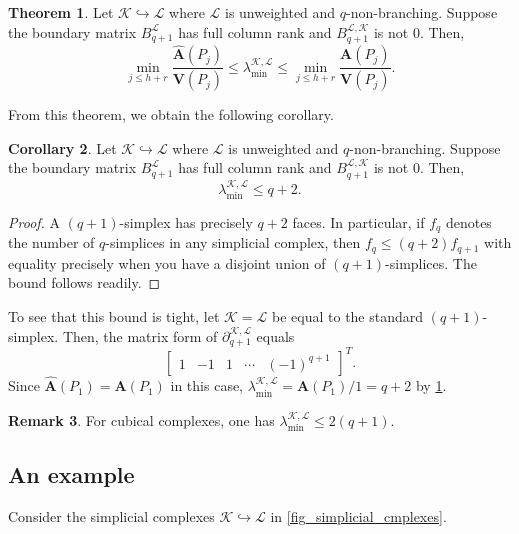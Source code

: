 \documentclass{article}
\theoremstyle{definition}
\newtheorem{theorem}{Theorem}[section]
\newtheorem{remark}[theorem]{Remark}
\newtheorem{corollary}[theorem]{Corollary}
\newcommand{\KK}{\mathcal{K}}
\newcommand{\LL}{\mathcal{L}}
\begin{document}
\begin{theorem}\label{prop:realcheeger}
Let $\KK\hookrightarrow \LL$ where $\LL$ is unweighted and $q$-non-branching. 
Suppose the boundary matrix $B_{q+1}^\LL$ has full column rank and $B_{q+1}^{\LL, \KK}$ is not $0$.
Then,
\[
\min\limits_{j\leq h+r}\frac{\widehat{\mathbf{A}}(P_j)}{\mathbf{V}(P_j)} \leq \lambda_{\mathrm{min}}^{\KK, \LL}\leq \min\limits_{j\leq h+r} \frac{\mathbf{A}(P_j)}{\mathbf{V}(P_j)}.
\]
\end{theorem}
From this theorem, we obtain the following corollary.
\begin{corollary}
Let $\KK\hookrightarrow \LL$ where $\LL$ is unweighted and $q$-non-branching. 
Suppose the boundary matrix $B_{q+1}^\LL$ has full column rank and $B_{q+1}^{\LL, \KK}$ is not $0$. Then,
\[
\lambda_{\mathrm{min}}^{\KK, \LL}\leq q+2.
\]
\end{corollary}
\begin{proof}
    A $(q+1)$-simplex has precisely $q+2$ faces. In particular, if $f_{q}$ denotes the number of $q$-simplices in any simplicial complex, then $f_{q} \leq (q+2)f_{q+1}$ with equality precisely when you have a disjoint union of $(q+1)$-simplices. The bound follows readily. 
\end{proof}
To see that this bound is tight, let $\KK=\LL$ be equal to the standard $(q+1)$-simplex. Then, the matrix form of $\partial_{q+1}^{\KK, \LL}$ equals 
\[ \begin{bmatrix} 1 & -1 & 1 & \cdots & (-1)^{q+1} \end{bmatrix}^T.\]
Since $\mathbf{\widehat{A}}(P_1) = \mathbf{A}(P_1)$ in this case, $\lambda_{\mathrm{min}}^{\KK, \LL} = \mathbf{A}(P_1)/1 = q+2$ by \cref{prop:realcheeger}.

\begin{remark}
    For cubical complexes, one has $\lambda_{\mathrm{min}}^{\KK, \LL}\leq 2(q+1).$
\end{remark}


\subsection{An example}
\label{ex_1}
Consider the simplicial complexes $\KK\hookrightarrow \LL$ in \cref{fig_simplicial_cmplexes}. 

\end{document}
